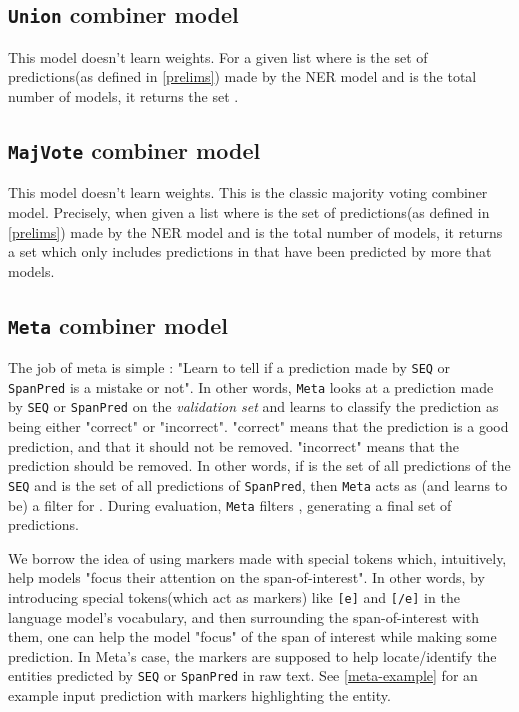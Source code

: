 \documentclass[11pt]{article}
\begin{document}
\subsection{\texttt{Union} combiner model}
This model doesn't learn weights. For a given list  where  is the set of predictions(as defined in \autoref{prelims}) made by the  NER model and  is the total number of models, it returns the set .   

\subsection{\texttt{MajVote} combiner model}
This model doesn't learn weights. This is the classic majority voting combiner model. Precisely,
when given a list  where  is the set of predictions(as defined in \autoref{prelims}) made by the  NER model and  is the total number of models, it returns a set which only includes predictions in  that have been predicted by more that  models.


\subsection{\texttt{Meta} combiner model}
The job of meta is simple : "Learn to tell if a prediction made by \texttt{SEQ} or \texttt{SpanPred} is a mistake or not". In other words, \texttt{Meta} looks at a prediction made by \texttt{SEQ} or \texttt{SpanPred} on the \textit{validation set} and learns to classify the prediction as being either "correct" or "incorrect". "correct" means that the prediction is a good prediction, and that it should not be removed. "incorrect" means that the prediction should be removed. In other words, if  is the set of all predictions of the \texttt{SEQ} and  is the set of all predictions of \texttt{SpanPred}, then \texttt{Meta} acts as (and learns to be) a filter for . During evaluation, \texttt{Meta} filters , generating a final set of predictions.

\par We borrow the idea of using markers made with special tokens \cite{baldini-soares-etal-2019-matching, xiao-etal-2020-denoising, ye-etal-2022-packed} which, intuitively, help models "focus their attention on the span-of-interest". In other words, by introducing special tokens(which act as markers) like \texttt{[e]} and \texttt{[/e]} in the language model's vocabulary, and then surrounding the span-of-interest with them, one can help the model "focus" of the span of interest while making some prediction. In Meta's case, the markers are supposed to help locate/identify the entities predicted by \texttt{SEQ} or \texttt{SpanPred} in raw text. See \autoref{meta-example} for an example input prediction with markers highlighting the entity.\par 
\end{document}

